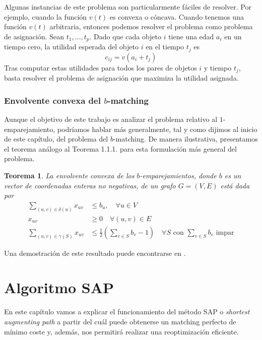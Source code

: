 \documentclass[twoside,a4paper,openright,12pt]{book}
\newtheorem{thm}{Teorema}[section]
\begin{document}
Algunas instancias de este problema son particularmente fáciles de resolver. Por ejemplo, cuando la función $v(t)$ es convexa o cóncava. Cuando tenemos una función $v(t)$ arbitraria, entonces podemos resolver el problema como problema de asignación. Sean $t_1,\dotsc, t_p$. Dado que cada objeto $i$ tiene una edad $a_i$ en un tiempo cero, la utilidad esperada del objeto $i$ en el tiempo $t_j$ es
$$
c_{ij} = v(a_i+t_j)
$$
Tras computar estas utilidades para todos los pares de objetos $i$ y tiempo $t_j$, basta resolver el problema de asignación que maximiza la utilidad asignada.
\subsection{Envolvente convexa del $b$-matching}
Aunque el objetivo de este trabajo es analizar el problema relativo al $1$-emparejamiento, podríamos hablar más generalmente, tal y como dijimos al inicio de este capítulo, del problema del $b$-matching. De manera ilustrativa, presentamos el teorema análogo al Teorema 1.1.1. para esta formulación más general del problema. 
\begin{thm}
La envolvente convexa de los $b$-emparejamientos, donde $b$ es un vector de coordenadas enteras no negativas, de un grafo $G=(V,E)$ está dada por
\begin{align*}
\sum_{(u,v)\in\delta(u)} x_{uv} &\leq b_u, \quad \forall u\in V\\
x_{uv} &\geq 0 \quad \forall(u,v)\in E\\
\sum_{(u,v)\in \gamma(S)} x_{uv}& \leq \frac{1}{2}\left(\sum_{v\in S} b_v -1\right) \quad \forall S \text{ con $\sum_{v\in S} b_v$ impar}
\end{align*}
\end{thm}
Una demostración de este resultado puede encontrarse en \cite{inte}.
\chapter{Algoritmo SAP}
En este capítulo vamos a explicar el funcionamiento del método SAP o \textit{shortest augmenting path} a partir del cuál puede obtenerse un matching perfecto de mínimo coste y, además, nos permitirá realizar una reoptimización eficiente.
\end{document}
